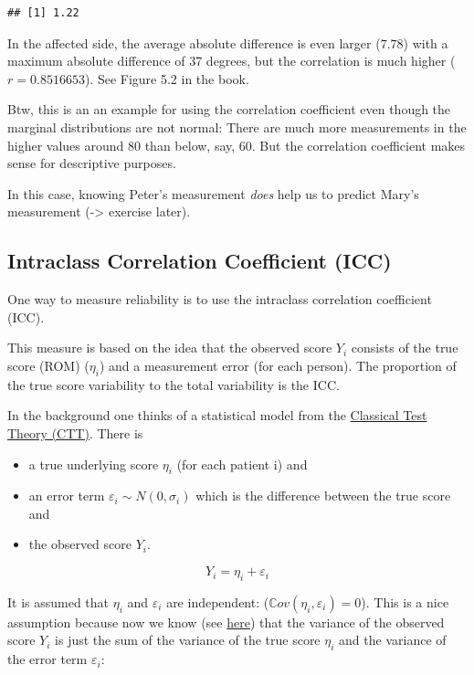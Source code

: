 \documentclass[
]{book}
\providecommand{\tightlist}{%
  \setlength{\itemsep}{0pt}\setlength{\parskip}{0pt}}
\begin{document}
\begin{verbatim}
## [1] 1.22
\end{verbatim}

In the affected side, the average absolute difference is even larger (\(7.78\))
with a maximum absolute difference of 37 degrees,
but the correlation is much higher (\(r=0.8516653\)). See Figure 5.2 in the book.

Btw, this is an an example for using the correlation coefficient even though
the marginal distributions are not normal: There are much more measurements in the higher
values around 80 than below, say, 60. But the correlation coefficient makes sense
for descriptive purposes.

In this case, knowing Peter's measurement \emph{does} help us to predict
Mary's measurement (-\textgreater{} exercise later).

\subsection{Intraclass Correlation Coefficient (ICC)}\label{intraclass-correlation-coefficient-icc}

One way to measure reliability is to use the intraclass correlation coefficient (ICC).

This measure is based on the idea that the observed score \(Y_i\) consists of the true score
(ROM) (\(\eta_i\)) and a measurement error (for each person).
The proportion of the true score variability to the total variability is the ICC.

In the background one thinks of a statistical model from the
\href{https://en.wikipedia.org/wiki/Classical_test_theory}{Classical Test Theory (CTT)}.
There is

\begin{itemize}
\tightlist
\item
  a true underlying score \(\eta_i\) (for each patient i) and
\item
  an error term \(\varepsilon_i \sim N(0, \sigma_i)\) which is the difference between the true
  score and
\item
  the observed score \(Y_i\).
\end{itemize}

\[Y_i = \eta_i + \varepsilon_i\]

It is assumed that \(\eta_i\) and \(\varepsilon_i\) are independent: (\(\mathbb{C}ov(\eta_i, \varepsilon_i)=0\)).
This is a nice assumption because now we know (see \href{https://en.wikipedia.org/wiki/Variance\#Addition_and_multiplication_by_a_constant}{here})
that the variance
of the observed score \(Y_i\) is just the sum of the variance of the true score \(\eta_i\)
and the variance of the error term \(\varepsilon_i\):
\end{document}
